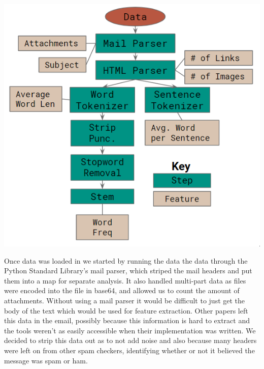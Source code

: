 \documentclass[12pt]{article}
\newenvironment{Figure}
  {\par\medskip\noindent\minipage{\linewidth}}
  {\endminipage\par\medskip}
\begin{document}
\begin{multicols}{2}
            \begin{Figure}
                \centering
                \includegraphics[width=\linewidth]{figures/prep.png}
                \label{fig:preprocess}
            \end{Figure}


            Once data was loaded in we started by running the data the data through
            the Python Standard Library's mail parser, which striped the mail headers
            and put them into a map for separate analysis. It also handled multi-part
            data as files were encoded into the file in base64, and allowed us to count
            the amount of attachments. Without using a mail
            parser it would be difficult to just get the body of the text which
            would be used for feature extraction. Other papers left this data in the
            email, possibly because this information is hard to extract and the tools
            weren't as easily accessible when their implementation was written. We
            decided to strip this data out as to not add noise and also because many 
            headers were left on from other spam checkers, identifying whether or not
            it believed the message was spam or ham.



\end{multicols}
\end{document}
